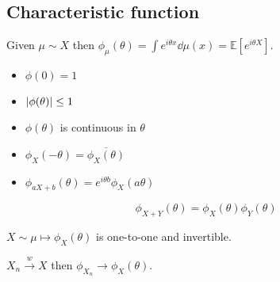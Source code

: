 \begin{theorem}
\end{theorem}

\subsection{Characteristic function}

\begin{definition}
	Given $\mu \sim X$ then $\phi_\mu(\theta) = \int e^{i\theta x} \dd{\mu(x)} = \mathbb{E} [e^{i\theta X}]$.
\end{definition}


\begin{itemize}
	\item $\phi(0)=1$
	\item $\abs{\phi(\theta)} \leq 1$
	\item $\phi(\theta)$ is continuous in $\theta$
	\item $\phi_X(-\theta)  = \overline{\phi_X(\theta)}$
	\item $\phi_{aX+b}(\theta)  = e^{i\theta b} \phi_X(a\theta)$
\end{itemize}

\begin{theorem}
	$$\phi_{X+Y}(\theta) = \phi_X(\theta)\phi_Y(\theta)$$
\end{theorem}
\begin{theorem}
	$X\sim \mu \mapsto \phi_{X}(\theta)$ is one-to-one and invertible.
\end{theorem}
\begin{theorem}
$X_n \stackrel{w}{\to} X$ then $\phi_{X_n} \to \phi_X(\theta)$.
\end{theorem}